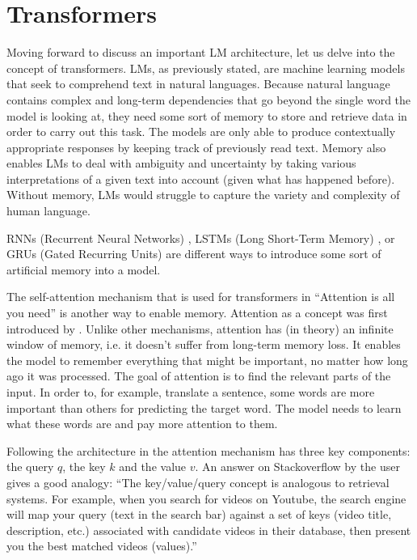 \section{Transformers}\label{transformers}

Moving forward to discuss an important LM architecture, let us delve into the concept of transformers. LMs, as previously stated, are machine learning models that seek to comprehend text in natural languages. Because natural language contains complex and long-term dependencies that go beyond the single word the model is looking at, they need some sort of memory to store and retrieve data in order to carry out this task. The models are only able to produce contextually appropriate responses by keeping track of previously read text. Memory also enables LMs to deal with ambiguity and uncertainty by taking various interpretations of a given text into account (given what has happened before). Without memory, LMs would struggle to capture the variety and complexity of human language.

RNNs (Recurrent Neural Networks) \citep{elman1990rnn}, LSTMs (Long Short-Term Memory) \citep{hochreiter1997lstm}, or GRUs (Gated Recurring Units) \citep{cho2014gru} are different ways to introduce some sort of artificial memory into a model.

The self-attention mechanism that is used for transformers in ``Attention is all you need'' \citep{vaswani2017attention} is another way to enable memory. Attention as a concept was first introduced by \citet{bahdanau2014neural}. Unlike other mechanisms, attention has (in theory) an infinite window of memory, i.e. it doesn't suffer from long-term memory loss. It enables the model to remember everything that might be important, no matter how long ago it was processed. The goal of attention is to find the relevant parts of the input. In order to, for example, translate a sentence, some words are more important than others for predicting the target word. The model needs to learn what these words are and pay more attention to them.

Following the architecture in \citet{vaswani2017attention} the attention mechanism has three key components: the query $q$, the key $k$ and the value $v$.
An answer on Stackoverflow by the user \citet{stackoverflow_attention} gives a good analogy: ``The key/value/query concept is analogous to retrieval systems. For example, when you search for videos on Youtube, the search engine will map your query (text in the search bar) against a set of keys (video title, description, etc.) associated with candidate videos in their database, then present you the best matched videos (values).''

